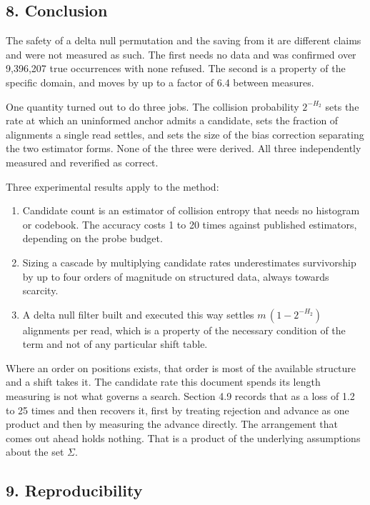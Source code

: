 \subsection{8. Conclusion}

The safety of a delta null permutation and the saving from it are different claims and were not
measured as such. The first needs no data and was confirmed over 9,396,207 true occurrences with
none refused. The second is a property of the specific domain, and moves by up to a factor of 6.4
between measures.

One quantity turned out to do three jobs. The collision probability \(2^{-H_2}\) sets the rate at
which an uninformed anchor admits a candidate, sets the fraction of alignments a single read
settles, and sets the size of the bias correction separating the two estimator forms. None of the
three were derived. All three independently measured and reverified as correct.

Three experimental results apply to the method:

\begin{enumerate}
  \item Candidate count is an estimator of collision entropy that needs no histogram or codebook.
    The accuracy costs 1 to 20 times against published estimators, depending on the probe budget.
  \item Sizing a cascade by multiplying candidate rates underestimates survivorship by up to four
    orders of magnitude on structured data, always towards scarcity.
  \item A delta null filter built and executed this way settles \(m\,(1 - 2^{-H_2})\) alignments
    per read, which is a property of the necessary condition of the term and not of any particular
    shift table.
\end{enumerate}

Where an order on positions exists, that order is most of the available structure and a shift takes it. The candidate rate this document spends its length measuring is not what governs a search. Section 4.9 records that as a loss of 1.2 to 25 times and then recovers it, first by treating rejection and advance as one product and then by measuring the advance directly. The arrangement that comes out ahead holds nothing. That is a product of the underlying assumptions about the set \(\Sigma\).

\subsection{9. Reproducibility}


